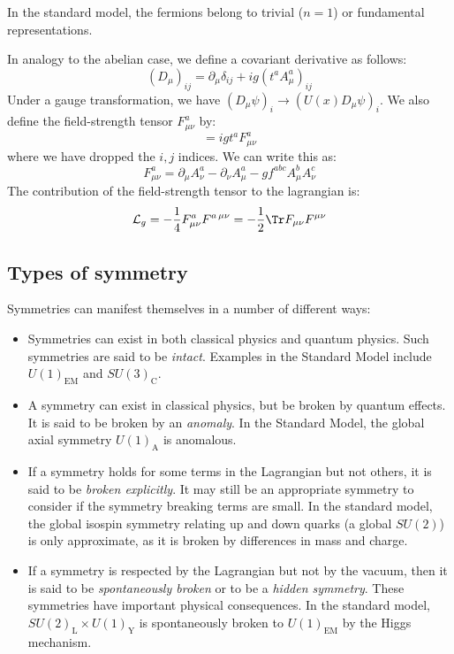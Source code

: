 \documentclass{jknotes}
\begin{document}
In the standard model, the fermions belong to trivial (\(n=1\)) or fundamental representations.

In analogy to the abelian case, we define a covariant derivative as follows:
\begin{equation}
    (D_\mu)_{ij} = \partial_\mu\delta_{ij} + ig(t^aA^a_\mu)_{ij}
\end{equation}
Under a gauge transformation, we have \((D_\mu\psi)_i\rightarrow (U(x)D_\mu\psi)_i\). We also define the field-strength tensor \(F^a_{\mu\nu}\) by:
\begin{equation}
    [D_\mu,D_\nu] = igt^aF^a_{\mu\nu}
\end{equation}
where we have dropped the \(i,j\) indices. We can write this as:
\begin{equation}
    F^a_{\mu\nu} = \partial_\mu A^a_\nu - \partial_\nu A^a_\mu - gf^{abc}A^b_\mu A^c_\nu
\end{equation}
The contribution of the field-strength tensor to the lagrangian is:
\begin{equation}
    \mathcal{L}_g = -\frac{1}{4}F^a_{\mu\nu}F^{a\,\mu\nu} = -\frac{1}{2}\Tr F_{\mu\nu}F^{\mu\nu}
\end{equation}

\subsection{Types of symmetry}
Symmetries can manifest themselves in a number of different ways:
\begin{itemize}
    \item Symmetries can exist in both classical physics and quantum physics. Such symmetries are said to be \emph{intact}. Examples in the Standard Model include \(U(1)_{\text{EM}}\) and \(SU(3)_{\text{C}}\).
    \item A symmetry can exist in classical physics, but be broken by quantum effects. It is said to be broken by an \emph{anomaly}. In the Standard Model, the global axial symmetry \(U(1)_{\text{A}}\) is anomalous.
    \item If a symmetry holds for some terms in the Lagrangian but not others, it is said to be \emph{broken explicitly}. It may still be an appropriate symmetry to consider if the symmetry breaking terms are small. In the standard model, the global isospin symmetry relating up and down quarks (a global \(SU(2)\)) is only approximate, as it is broken by differences in mass and charge.
    \item If a symmetry is respected by the Lagrangian but not by the vacuum, then it is said to be \emph{spontaneously broken} or to be a \emph{hidden symmetry}. These symmetries have important physical consequences. In the standard model, \(SU(2)_{\text{L}} \times U(1)_{\text{Y}}\) is spontaneously broken to \(U(1)_{\text{EM}}\) by the Higgs mechanism.
\end{itemize}
\end{document}
